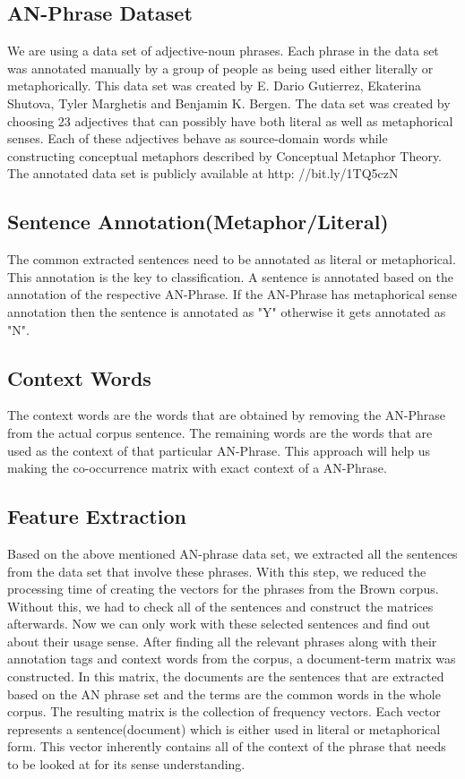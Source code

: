 \documentclass[a4paper]{article}
\begin{document}
\subsection{AN-Phrase Dataset}
We are using a data set of adjective-noun phrases. Each phrase in the data set was annotated manually by a group of people  as being used either literally or metaphorically. This data set was created by E. Dario Gutierrez, Ekaterina Shutova, Tyler Marghetis and Benjamin K. Bergen. The data set was created by choosing 23 adjectives that can possibly have both literal as well as metaphorical senses. Each of these adjectives behave as source-domain words while constructing conceptual metaphors described by Conceptual Metaphor Theory. The annotated data set is publicly available at http:
//bit.ly/1TQ5czN

\subsection{Sentence Annotation(Metaphor/Literal)}
The common extracted sentences need to be annotated as literal or metaphorical. This annotation is the key to classification. A sentence is annotated based on the annotation of the respective AN-Phrase. If the AN-Phrase has metaphorical sense annotation then the sentence is annotated as "Y" otherwise it gets annotated as "N".

\subsection{Context Words}
The context words are the words that are obtained by removing the AN-Phrase from the actual corpus sentence. The remaining words are the words that are used as the context of that particular AN-Phrase. This approach will help us making the co-occurrence matrix with exact context of a AN-Phrase.  

\subsection{Feature Extraction}
Based on the above mentioned AN-phrase data set, we extracted all the sentences from the data set that involve these phrases. With this step, we reduced the processing time of creating the vectors for the phrases from the Brown corpus. Without this, we had to check all of the sentences and construct the matrices afterwards. Now we can only work with these selected sentences and find out about their usage sense.
After finding all the relevant phrases along with their annotation tags and context words from the corpus, a document-term matrix was constructed. In this matrix, the documents are the sentences that are extracted based on the AN phrase set and the terms are the common words in the whole corpus. The resulting matrix is the collection of frequency vectors. Each vector represents a sentence(document) which is either used in literal or metaphorical form. This vector inherently contains all of the context of the phrase that needs to be looked at for its sense understanding.
\end{document}
